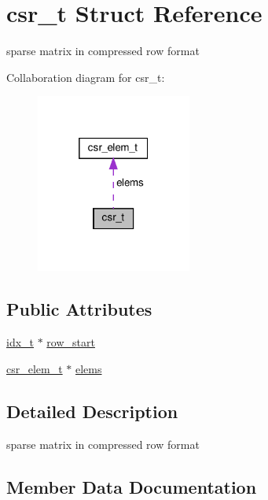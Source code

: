 \hypertarget{structcsr__t}{}\section{csr\+\_\+t Struct Reference}
\label{structcsr__t}


sparse matrix in compressed row format  




Collaboration diagram for csr\+\_\+t\+:\nopagebreak
\begin{figure}[H]
\begin{center}
\leavevmode
\includegraphics[width=145pt]{structcsr__t__coll__graph}
\end{center}
\end{figure}
\subsection*{Public Attributes}
\begin{DoxyCompactItemize}
\item 
\hyperlink{spmv_8cc_a8e93478a00e685bea5e6a3f617bf03a3}{idx\+\_\+t} $\ast$ \hyperlink{structcsr__t_ac7fedb71b649719de7dd835a06d90180}{row\+\_\+start}
\item 
\hyperlink{structcsr__elem__t}{csr\+\_\+elem\+\_\+t} $\ast$ \hyperlink{structcsr__t_a2d9f2bdf6b3fdd7aad2799bcdcfcd17c}{elems}
\end{DoxyCompactItemize}


\subsection{Detailed Description}
sparse matrix in compressed row format 

\subsection{Member Data Documentation}
\mbox{\label{structcsr__t_a2d9f2bdf6b3fdd7aad2799bcdcfcd17c}} 
